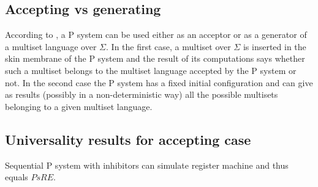 \documentclass[a4paper,10pt]{article}
\begin{document}

\subsection{Accepting vs generating} %
\label{sub:accepting_vs_generating}
  According to \cite{Barbuti:2010:MSW:1946067.1946081}, a P system can be used either as an acceptor or as a generator of a multiset language over $\Sigma$. In the first case, a multiset over $\Sigma$ is inserted in the skin membrane of the P system and the result of its computations says whether such a multiset belongs to the multiset language accepted by the P system or not. In the second case the P system has a fixed initial configuration and can give as results (possibly in a non-deterministic way) all the possible multisets belonging to a given multiset language.


\subsection{Universality results for accepting case} %
\label{sub:universality_results_for_accepting_case}

\begin{veta}
  Sequential P system with inhibitors can simulate register machine and thus equals $PsRE$.
\end{veta}
\end{document}

